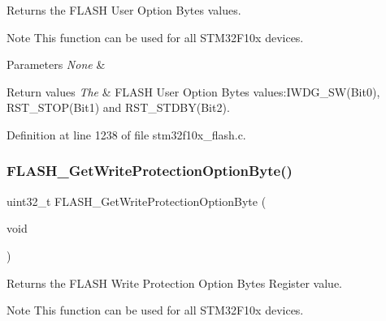 Returns the F\+L\+A\+SH User Option Bytes values. 

\begin{DoxyNote}{Note}
This function can be used for all S\+T\+M32\+F10x devices. 
\end{DoxyNote}

\begin{DoxyParams}{Parameters}
{\em None} & \\
\hline
\end{DoxyParams}

\begin{DoxyRetVals}{Return values}
{\em The} & F\+L\+A\+SH User Option Bytes values\+:I\+W\+D\+G\+\_\+\+S\+W(\+Bit0), R\+S\+T\+\_\+\+S\+T\+O\+P(\+Bit1) and R\+S\+T\+\_\+\+S\+T\+D\+B\+Y(\+Bit2). \\
\hline
\end{DoxyRetVals}


Definition at line 1238 of file stm32f10x\+\_\+flash.\+c.

\mbox{\label{group___f_l_a_s_h___private___functions_gac009e061562c7d36d7d2d00bb1c8aafa}} 
\subsubsection{\texorpdfstring{F\+L\+A\+S\+H\+\_\+\+Get\+Write\+Protection\+Option\+Byte()}{FLASH\_GetWriteProtectionOptionByte()}}
{\footnotesize\ttfamily uint32\+\_\+t F\+L\+A\+S\+H\+\_\+\+Get\+Write\+Protection\+Option\+Byte (\begin{DoxyParamCaption}\item[{void}]{ }\end{DoxyParamCaption})}



Returns the F\+L\+A\+SH Write Protection Option Bytes Register value. 

\begin{DoxyNote}{Note}
This function can be used for all S\+T\+M32\+F10x devices. 
\end{DoxyNote}

